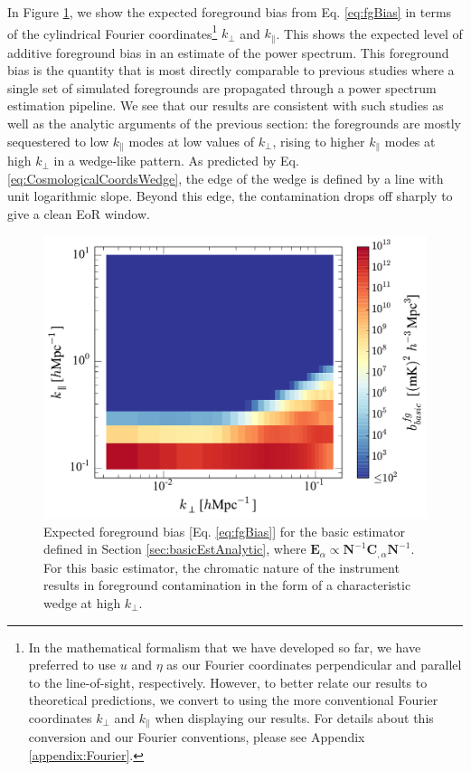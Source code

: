 \documentclass[twocolumn,aps,prd,nofootinbib,showpacs]{revtex4-1}
\begin{document}
In Figure \ref{fig:basicEstBias}, we show the expected foreground bias from  Eq. \eqref{eq:fgBias} in terms of the cylindrical Fourier coordinates\footnote{In the mathematical formalism that we have developed so far, we have preferred to use $u$ and $\eta$ as our Fourier coordinates perpendicular and parallel to the line-of-sight, respectively.  However, to better relate our results to theoretical predictions, we convert to using the more conventional Fourier coordinates $k_\perp$ and $k_\parallel$ when displaying our results.  For details about this conversion and our Fourier conventions, please see Appendix \ref{appendix:Fourier}.} $k_\perp$ and $k_\parallel$.  This shows the expected level of additive foreground bias in an estimate of the power spectrum.  This foreground bias is the quantity that is most directly comparable to previous studies where a single set of simulated foregrounds are propagated through a power spectrum estimation pipeline.  We see that our results are consistent with such studies as well as the analytic arguments of the previous section: the foregrounds are mostly sequestered to low $k_\parallel$ modes at low values of $k_\perp$, rising to higher $k_\parallel$ modes at high $k_\perp$ in a wedge-like pattern.  As predicted by  Eq. \eqref{eq:CosmologicalCoordsWedge}, the edge of the wedge is defined by a line with unit logarithmic slope.  Beyond this edge, the contamination drops off sharply to give a clean EoR window.

\begin{figure}[t] 
	\centering 
	\includegraphics[width=.49\textwidth]{simpleEstBias.pdf}
	\caption{Expected foreground bias [Eq. \eqref{eq:fgBias}] for the basic estimator defined in Section \ref{sec:basicEstAnalytic}, where $\mathbf{E}_\alpha \propto \mathbf{N}^{-1} \mathbf{C}_{,\alpha} \mathbf{N}^{-1}$.  For this basic estimator, the chromatic nature of the instrument results in foreground contamination in the form of a characteristic wedge at high $k_\perp$.}
	\label{fig:basicEstBias}
\end{figure} 
\end{document}

